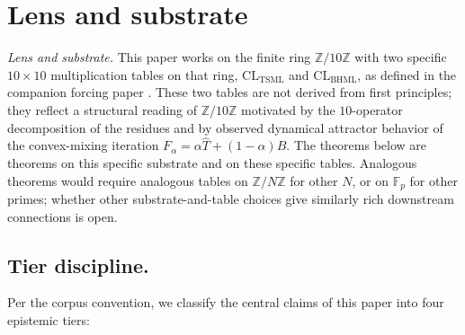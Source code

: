 \documentclass[11pt,reqno]{amsart}
\theoremstyle{plain}
\theoremstyle{definition}
\theoremstyle{remark}
\newcommand{\Z}{\mathbb{Z}}
\newcommand{\F}{\mathbb{F}}
\newcommand{\TSML}{\mathrm{TSML}}
\newcommand{\BHML}{\mathrm{BHML}}
\begin{document}
\maketitle

\tableofcontents

\section*{Lens and substrate}

\emph{Lens and substrate.} This paper works on the finite ring
$\Z/10\Z$ with two specific $10 \times 10$ multiplication tables on
that ring, $\mathrm{CL}_\TSML$ and $\mathrm{CL}_\BHML$, as defined in
the companion forcing paper \cite{SandersForcing}.  These two tables
are not derived from first principles; they reflect a structural
reading of $\Z/10\Z$ motivated by the $10$-operator decomposition of
the residues and by observed dynamical attractor behavior of the
convex-mixing iteration $F_\alpha = \alpha \widehat{T} + (1{-}\alpha)
\widehat{B}$.  The theorems below are theorems on this specific
substrate and on these specific tables.  Analogous theorems would
require analogous tables on $\Z/N\Z$ for other $N$, or on $\F_p$ for
other primes; whether other substrate-and-table choices give similarly
rich downstream connections is open.

\subsection*{Tier discipline.}
Per the corpus convention, we classify the central claims of this
paper into four epistemic tiers:
\end{document}
